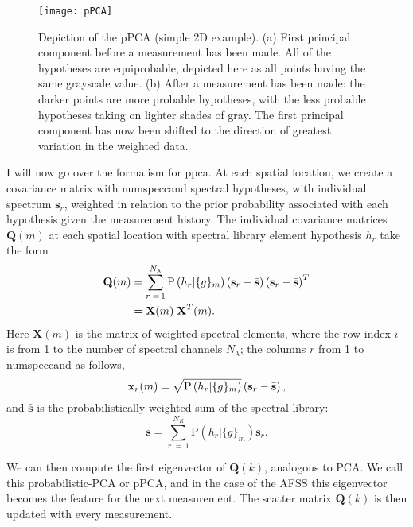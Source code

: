 %
\begin{figure}[htb]
  \centering
  \texttt{[image: pPCA]}
  \caption{Depiction of the pPCA (simple 2D example). (a) First principal component before a measurement has been made. All of the hypotheses are equiprobable, depicted here as all points having the same grayscale value. (b) After a measurement has been made: the darker points are more probable hypotheses, with the less probable hypotheses taking on lighter shades of gray. The first principal component has now been shifted to the direction of greatest variation in the weighted data.}\label{fig:pPCA}
\end{figure}
%
I will now go over the formalism for \gls{ppca}. At each spatial location, we create a covariance matrix with \gls{numspeccand} spectral hypotheses, with individual spectrum $\textbf{s}_r$, weighted in relation to the prior probability associated with each hypothesis given the measurement history. The individual covariance matrices $\textbf{{Q}}(m)$ at each spatial location with spectral library element hypothesis $h_r$ take the form
%
%
\begin{align}
\textbf{Q}(m) &= \sum^{N_{\lambda}}_{r \;= \,1} \mbox{P} \left( h_r | \{g\}_m \right) \left(\textbf{s}_r - \bar{\textbf{s}} \right) \left(\textbf{s}_r - \bar{\textbf{s}} \right)^T \notag \\
&=\textbf{X}(m)\;\textbf{X}^T(m). \label{eq:preScatter}
\end{align}
%
%
Here $\textbf{X}(m)$ is the matrix of weighted spectral elements, where the row index $i$ is from 1 to the number of spectral channels $N_{\lambda}$; the columns $r$ from 1 to \gls{numspeccand} as follows,
%
%
\begin{equation}
	\textbf{x}_{r}(m) = \sqrt{\mbox{P} \left(h_r \vert \{g\}_m \right)} \left(\mathbf{s}_{r} - \bar{\textbf{s}}\right),
\end{equation}
%
%
and $\bar{\textbf{s}}$ is the probabilistically-weighted sum of the spectral library:
%
%
\begin{equation} \label{eq:Sbar}
\bar{\textbf{s}} = \sum^{N_R}_{r \;= \, 1} \mbox{P} \left( h_r | \{g\}_m \right) \textbf{s}_r.
\end{equation}


We can then compute the first eigenvector of $\textbf{Q}(k)$, analogous to PCA. We call this probabilistic-PCA or pPCA, and in the case of the AFSS this eigenvector becomes the feature for the next measurement. The scatter matrix $\textbf{Q}(k)$ is then updated with every measurement.

